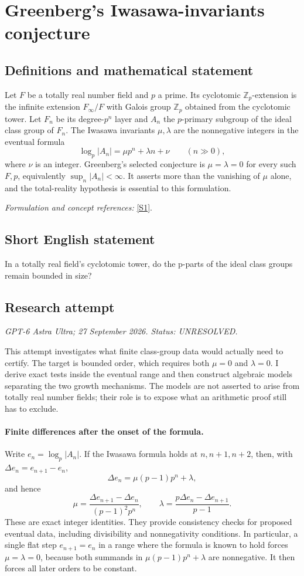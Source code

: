 \documentclass[11pt]{article}
\begin{document}
\section*{\texorpdfstring{Greenberg's Iwasawa-invariants conjecture}{Greenberg's Iwasawa-invariants conjecture}}\label{9400050}
\subsection{Definitions and mathematical statement}
Let $F$ be a totally real number field and $p$ a prime. Its cyclotomic ${\mathbb{Z}}_p$-extension is the infinite extension $F_\infty/F$ with Galois group ${\mathbb{Z}}_p$ obtained from the cyclotomic tower. Let $F_n$ be its degree-$p^n$ layer and $A_n$ the $p$-primary subgroup of the ideal class group of $F_n$. The Iwasawa invariants $\mu,\lambda$ are the nonnegative integers in the eventual formula
\[
 \log_p|A_n|=\mu p^n+\lambda n+\nu\qquad(n\gg0),
\]
where $\nu$ is an integer. Greenberg's selected conjecture is $\mu=\lambda=0$ for every such $F,p$, equivalently $\sup_n|A_n|<\infty$. It asserts more than the vanishing of $\mu$ alone, and the total-reality hypothesis is essential to this formulation.
\par\smallskip\textit{Formulation and concept references:} \href{https://arxiv.org/html/2503.15727v2}{[S1]}.

\subsection{Short English statement}
In a totally real field's cyclotomic tower, do the p-parts of the ideal class groups remain bounded in size?
\subsection{Research attempt}
\textit{GPT-6 Astra Ultra; 27 September 2026. Status: UNRESOLVED.}

This attempt investigates what finite class-group data would actually
need to certify. The target is bounded order, which requires both
$\mu=0$ and $\lambda=0$. I derive exact tests inside the eventual
range and then construct algebraic models separating the two growth
mechanisms. The models are not asserted to arise from totally real
number fields; their role is to expose what an arithmetic proof still
has to exclude.

\paragraph{Finite differences after the onset of the formula.}
Write $e_n=\log_p|A_n|$. If the Iwasawa formula holds at $n,n+1,n+2$,
then, with $\Delta e_n=e_{n+1}-e_n$,
\[
 \Delta e_n=\mu(p-1)p^n+\lambda,
\]
and hence
\[
 \mu=\frac{\Delta e_{n+1}-\Delta e_n}{(p-1)^2p^n},
 \qquad
 \lambda=\frac{p\Delta e_n-\Delta e_{n+1}}{p-1}.       \tag{1}
\]
These are exact integer identities. They provide consistency checks
for proposed eventual data, including divisibility and nonnegativity
conditions. In particular, a single flat step $e_{n+1}=e_n$ in a range
where the formula is known to hold forces $\mu=\lambda=0$, because
both summands in $\mu(p-1)p^n+\lambda$ are nonnegative. It then forces
all later orders to be constant.
\end{document}
